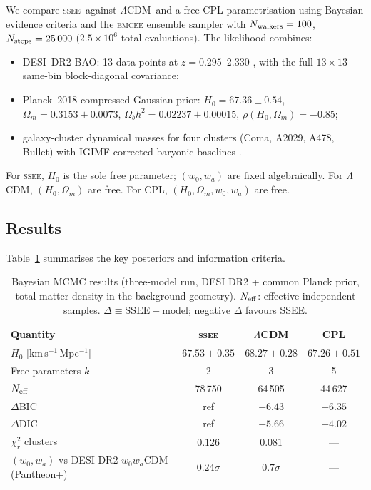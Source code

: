 \documentclass[12pt,a4paper]{article}
\newcommand{\SSEE}{\textsc{ssee}}
\newcommand{\LCDM}{$\Lambda$CDM}
\newcommand{\Omm}{\Omega_{m}}
\newcommand{\wz}{w_0}
\newcommand{\wa}{w_a}
\begin{document}
We compare \SSEE\ against \LCDM\ and a free CPL parametrisation using
Bayesian evidence criteria and the \textsc{emcee} ensemble sampler
\citep{emcee} with $N_{\rm walkers}=100$, $N_{\rm steps}=25\,000$
($2.5\times10^6$ total evaluations).
The likelihood combines:
\begin{itemize}[itemsep=1pt]
  \item DESI~DR2 BAO: 13 data points at $z=0.295$--$2.330$ \citep{AbdulKarim2025},
    with the full $13\times13$ same-bin block-diagonal covariance;
  \item Planck~2018 compressed Gaussian prior:
    $H_0=67.36\pm0.54$, $\Omm = 0.3153\pm0.0073$,
    $\Omega_b h^2 = 0.02237\pm0.00015$, $\rho(H_0,\Omm)=-0.85$;
  \item galaxy-cluster dynamical masses for four clusters (Coma, A2029, A478,
    Bullet) with IGIMF-corrected baryonic baselines \citep{Zhang2026}.
\end{itemize}
For \SSEE, $H_0$ is the sole free parameter; $(\wz,\wa)$ are fixed algebraically.
For \LCDM, $(H_0, \Omm)$ are free. For CPL, $(H_0,\Omm,\wz,\wa)$ are free.

\subsection{Results}
\label{sec:mcmc_results}

Table~\ref{tab:mcmc_results} summarises the key posteriors and information criteria.

\begin{table}[htbp]
\centering
\caption{Bayesian MCMC results (three-model run, DESI DR2 + common Planck prior,
         total matter density in the background geometry). $N_{\rm eff}$:
         effective independent samples. $\Delta\equiv\mathrm{SSEE}-\mathrm{model}$;
         negative $\Delta$ favours SSEE.}
\label{tab:mcmc_results}
\begin{tabular}{p{} c c c}
\toprule
Quantity & \SSEE & \LCDM & CPL \\
\midrule
$H_0$ [km\,s$^{-1}$\,Mpc$^{-1}$] & $67.53\pm0.35$ & $68.27\pm0.28$ & $67.26\pm0.51$ \\
Free parameters $k$ & 2 & 3 & 5 \\
$N_{\rm eff}$ & 78\,750 & 64\,505 & 44\,627 \\
$\Delta\mathrm{BIC}$ & ref & $-6.43$ & $-6.35$ \\
$\Delta\mathrm{DIC}$ & ref & $-5.66$ & $-4.02$ \\
$\chi^2_r$ clusters & $0.126$ & $0.081$ & — \\
$(w_0, w_a)$ vs DESI DR2 $w_0w_a$CDM (Pantheon+) & $0.24\sigma$ & $0.7\sigma$ & — \\
\bottomrule
\end{tabular}
\end{table}
\end{document}
